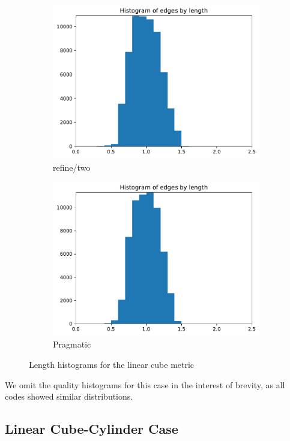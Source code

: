 \documentclass[3p,times,procedia,number]{elsarticle}
\begin{document}
\begin{figure}
\begin{subfigure}{.16\textwidth}
\includegraphics[width=\textwidth]{refine-two-cube-linear-length.pdf}
\caption{refine/two}
\end{subfigure}
\begin{subfigure}{.16\textwidth}
\centering
\includegraphics[width=\textwidth]{pragmatic-cube-linear-length.pdf}
\caption{Pragmatic}
\end{subfigure}
\caption{Length histograms for the linear cube metric}
\label{fig:cube-linear-lengths}
\end{figure}

We omit the quality histograms for this case in the interest
of brevity, as all codes showed similar distributions.

\subsection{Linear Cube-Cylinder Case}
\end{document}
